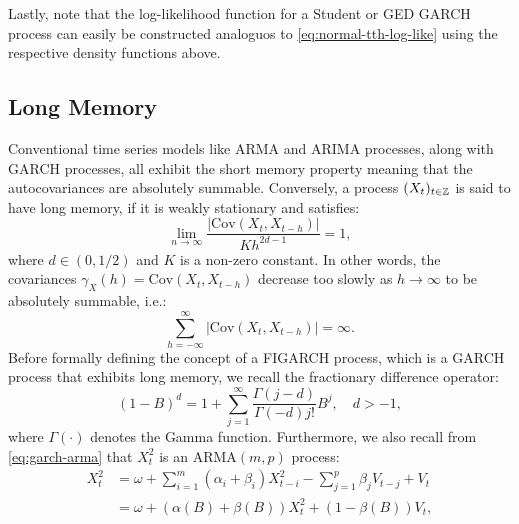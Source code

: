 Lastly, note that the log-likelihood function for a Student or GED GARCH process can easily be constructed analoguos to \eqref{eq:normal-tth-log-like} using the respective density functions above.

\subsection{Long Memory}
Conventional time series models like ARMA and ARIMA processes, along with GARCH processes, all exhibit the short memory property meaning that the autocovariances are absolutely summable. Conversely, a process $(X_{t})_{t\in\mathbb{Z}}$ is said to have long memory, if it is weakly stationary and satisfies:
\begin{equation}
    \lim_{n\to\infty}\frac{|\textrm{Cov}(X_{t},X_{t-h})|}{Kh^{2d-1}}=1,
\end{equation}
where $d\in (0,1/2)$ and $K$ is a non-zero constant. In other words, the covariances $\gamma_{X}(h)=\textrm{Cov}(X_{t},X_{t-h})$ decrease too slowly as $h\to \infty$ to be absolutely summable, i.e.:
\begin{equation}
    \sum_{h=-\infty}^{\infty}|\textrm{Cov}(X_{t},X_{t-h})|=\infty.
\end{equation}
Before formally defining the concept of a FIGARCH process, which is a GARCH process that exhibits long memory, we recall the fractionary difference operator:
\begin{equation}
    (1-B)^{d}=1+\sum_{j=1}^{\infty}\frac{\Gamma(j-d)}{\Gamma(-d)j!}B^{j}, \quad d>-1,
\end{equation}
where $\Gamma(\cdot)$ denotes the Gamma function.
Furthermore, we also recall from \eqref{eq:garch-arma} that $X_{t}^{2}$ is an ARMA$(m,p)$ process:
\begin{align}
    X_{t}^{2}& =\omega + \sum_{i=1}^{m}(\alpha_{i}+\beta_{i})X_{t-i}^{2}-\sum_{j=1}^{p}\beta_{j}V_{t-j}+V_{t}\\
    & = \omega + \left(\alpha(B)+\beta(B)\right)X_{t}^{2}+ \left(1-\beta(B)\right)V_{t},
\end{align}
